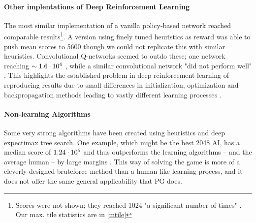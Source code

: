 \documentclass[11pt, fleqn]{article}
\begin{document}
\paragraph*{Other implentations of Deep Reinforcement Learning}
The most similar implementation of a vanilla policy-based network reached comparable results\footnote{Scores were not shown; they reached 1024 "a significant number of times" \cite[3.4]{Amar}. Our max. tile statistics are in \ref{mtile}}\cite{Amar}. A version using finely tuned heuristics as reward was able to push mean scores to 5600  \cite{Nie} though we could not replicate this with similar heuristics. Convolutional Q-networks seemed to outdo these; one network reaching $\sim 1.6\cdot10^{4}$ \cite{Vir}, while a similar convolutional network "did not perform well" \cite[introduction, slide 15]{Wie}. This highlights the established problem in deep reinforcement learning of reproducing results due to small differences in initialization, optimization and backpropagation methods leading to vastly different learning processes \cite{Hend}. 

\paragraph*{Non-learning Algorithms}
Some very strong algorithms have been created using heuristics and deep expectimax tree search. One example, which might be the best 2048 AI, has a median score of $1.24\cdot10^{5}$ and thus outperforms the learning algorithms -- and the average human -- by large margins \cite{Xiao}. This way of solving the game is more of a cleverly designed bruteforce method than a human like learning process, and it does not offer the same general applicability that PG does.
\end{document}
